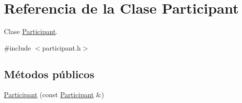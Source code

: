 \hypertarget{class_participant}{}\section{Referencia de la Clase Participant}
\label{class_participant}


Clase \hyperlink{class_participant}{Participant}.  




{\ttfamily \#include $<$participant.\+h$>$}

\subsection*{Métodos públicos}
\begin{DoxyCompactItemize}
\item 
\hyperlink{class_participant_a09e54ccec8ebca53dfb49c240b6d1ecd}{Participant} (const \hyperlink{class_participant}{Participant} \&)\hypertarget{class_participant_a09e54ccec8ebca53dfb49c240b6d1ecd}{}\label{class_participant_a09e54ccec8ebca53dfb49c240b6d1ecd}


\end{DoxyCompactItemize}
